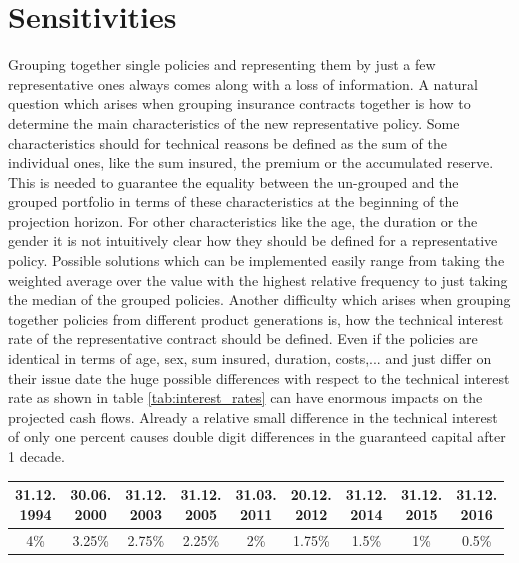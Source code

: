 

\chapter{Sensitivities}
\label{cha:sensitivities}

Grouping together single policies and representing them by just a few representative ones always comes along with a loss of information. A natural question which arises when grouping insurance contracts together is how to determine the main characteristics of the new representative policy. Some characteristics should for technical reasons be defined as the sum of the individual ones, like the sum insured, the premium or the accumulated reserve. This is needed to guarantee the equality between the un-grouped and the grouped portfolio in terms of these characteristics at the beginning of the projection horizon. For other characteristics like the age, the duration or the gender it is not intuitively clear how they should be defined for a representative policy. Possible solutions which can be implemented easily range from taking the weighted average over the value with the highest relative frequency to just taking the median of the grouped policies. Another difficulty which arises when grouping together policies from different product generations is, how the technical interest rate of the representative contract should be defined. Even if the policies are identical in terms of age, sex, sum insured, duration, costs,... and just differ on their issue date the huge possible differences with respect to the technical interest rate as shown in table \ref{tab:interest_rates} can have enormous impacts on the projected cash flows. 
Already a relative small difference in the technical interest of only one percent causes double digit differences in the guaranteed capital after 1 decade. 

\begin{minipage}{\linewidth}
	\centering
	\begin{tabular}{*{9}{c}}
	\toprule
	\makecell{31.12.\\1994} & \makecell{30.06.\\2000} & \makecell{31.12.\\2003} & \makecell{31.12.\\2005} & 				\makecell{31.03.\\2011}  & \makecell{20.12.\\2012} & \makecell{31.12.\\2014} & \makecell{31.12.\\2015} & 				\makecell{31.12.\\2016}\\
	\midrule
	4\% & 3.25\% & 2.75\% & 2.25\% & 2\% & 1.75\% & 1.5\% & 1\% & 0.5\% \\
	\bottomrule
	\end{tabular}
	\label{tab:interest_rates}
\end{minipage}

